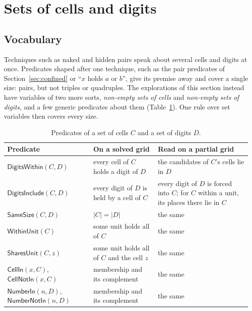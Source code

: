 \documentclass[11pt,a4paper]{article}
\theoremstyle{definition}
\theoremstyle{remark}
\newcommand{\pred}[1]{\mathsf{#1}}
\begin{document}
\section{Sets of cells and digits}\label{sec:sets}

\subsection{Vocabulary}

Techniques such as naked and hidden pairs speak about several cells and digits at once. Predicates shaped after one technique, such as the pair predicates of Section~\ref{sec:confined} or ``$x$ holds $a$ or $b$'', give its premise away and cover a single size: pairs, but not triples or quadruples. The explorations of this section instead have variables of two more sorts, \emph{non-empty sets of cells} and \emph{non-empty sets of digits}, and a few generic predicates about them (Table~\ref{tab:sets}). One rule over set variables then covers every size.

\begin{table}[t]
\centering\small
\begin{tabularx}{\textwidth}{@{}l>{\raggedright\arraybackslash}X>{\raggedright\arraybackslash}X@{}}
\toprule
Predicate & On a solved grid & Read on a partial grid \\
\midrule
$\pred{DigitsWithin}(C, D)$ & every cell of $C$ holds a digit of $D$ & the candidates of $C$'s cells lie in $D$ \\
$\pred{DigitsInclude}(C, D)$ & every digit of $D$ is held by a cell of $C$ & every digit of $D$ is forced into $C$; for $C$ within a unit, its places there lie in $C$ \\
$\pred{SameSize}(C, D)$ & $\lvert C\rvert = \lvert D\rvert$ & the same \\
$\pred{WithinUnit}(C)$ & some unit holds all of $C$ & the same \\
$\pred{SharesUnit}(C, z)$ & some unit holds all of $C$ and the cell $z$ & the same \\
$\pred{CellIn}(x, C)$, $\pred{CellNotIn}(x, C)$ & membership and its complement & the same \\
$\pred{NumberIn}(n, D)$, $\pred{NumberNotIn}(n, D)$ & membership and its complement & the same \\
\bottomrule
\end{tabularx}
\caption{Predicates of a set of cells $C$ and a set of digits $D$.}
\label{tab:sets}
\end{table}
\end{document}
